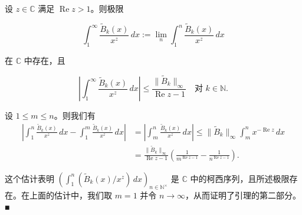 \begin{lemma}

设 $ z \in \mathbb{C} $ 满足 $ \operatorname{Re} z > 1 $。则极限

\[
\int_1^\infty \frac{\widetilde{B}_k(x)}{x^z}\,dx := \lim_{n}\int_1^n \frac{\widetilde{B}_k(x)}{x^z}\,dx
\]

在 $ \mathbb{C} $ 中存在，且

\[
\left| \int_1^\infty \frac{\widetilde{B}_k(x)}{x^z}\,dx \right| \le \frac{\|\widetilde{B}_k\|_\infty}{\operatorname{Re} z - 1} \quad \text{对 } k \in \mathbb{N} .
\]

\proofhead
设 $ 1 \le m \le n $。则我们有
\begin{equation*}
\begin{aligned}
\left| \int_1^n \frac{\widetilde{B}_k(x)}{x^z}\,dx - \int_1^m \frac{\widetilde{B}_k(x)}{x^z}\,dx \right| &= \left| \int_m^n \frac{\widetilde{B}_k(x)}{x^z}\,dx \right| \le \|\widetilde{B}_k\|_\infty\int_m^n x^{-\operatorname{Re} z}\,dx \\ &= \frac{\|\widetilde{B}_k\|_\infty}{\operatorname{Re} z - 1}\left( \frac{1}{m^{\operatorname{Re} z - 1}} - \frac{1}{n^{\operatorname{Re} z - 1}} \right) .
\end{aligned}
\end{equation*}

这个估计表明 $ \left( \int_1^n (\widetilde{B}_k(x)/x^z)\,dx \right)_{n\in\mathbb{N}^\times} $ 是 $ \mathbb{C} $ 中的柯西序列，且所述极限存在。在上面的估计中，我们取 $ m = 1 $ 并令 $ n \to \infty $，从而证明了引理的第二部分。\nobreak\hspace{0.35em}■

\end{lemma}

